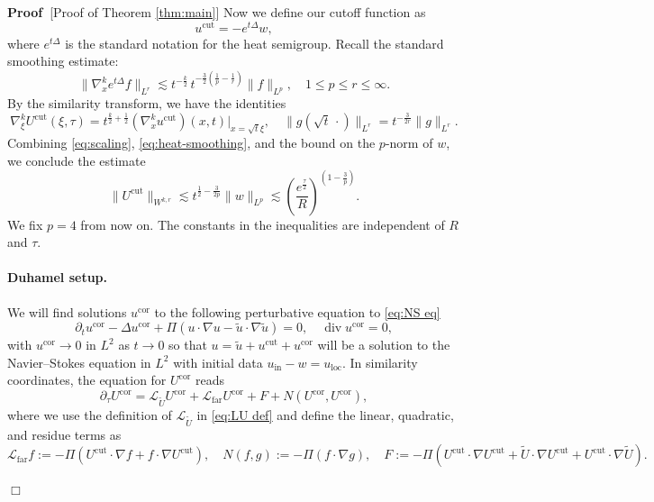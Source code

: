 \documentclass[11pt,a4paper]{article}
\numberwithin{equation}{section}
\newcommand{\assign}{:=}
\newcommand{\tmop}[1]{\ensuremath{\operatorname{#1}}}
\newenvironment{proof}{\noindent\textbf{Proof\ }}{\hspace*{\fill}$\Box$\medskip}
\begin{document}
\begin{proof}[Proof of Theorem \ref{thm:main}]
Now we define our cutoff function as\[u^{\text{cut}}=-e^{t
\Delta}w,\]
where $e^{t
\Delta}$ is the standard notation for the heat semigroup. Recall the standard smoothing estimate:
\begin{equation}\label{eq:heat-smoothing}
\|\nabla_x^k e^{t\Delta}f\|_{L^r}\lesssim t^{-\frac{k}{2}}\,t^{-\frac{3}{2}(\frac1p-\frac1r)}\|f\|_{L^p},
\quad 1\leqslant p\leqslant r\leqslant\infty.
\end{equation}
By the similarity transform, we have the identities
\begin{equation}\label{eq:scaling}
\nabla_\xi^k U^{\text{cut}}(\xi,\tau)
=t^{\frac{k}{2}+\frac12}(\nabla_x^k u^{\text{cut}})(x,t)\Big|_{x=\sqrt t\xi},
\quad 
\|g(\sqrt t\,\cdot)\|_{L^r}=t^{-\frac{3}{2r}}\|g\|_{L^r}.
\end{equation}
Combining \eqref{eq:scaling}, \eqref{eq:heat-smoothing}, and the bound on the $p$-norm of $w$, we conclude the estimate
\begin{equation}
    \|U^{\text{cut}}\|_{W^{k,r}}
\lesssim  t^{\frac12-\frac{3}{2p}}\|w\|_{L^p}
\lesssim (\frac{e^{\frac\tau2}}{R})^{(1-\frac{3}{p})}.
\label{ucut est}
\end{equation}
We fix $p=4$ from now on. 
The constants in the inequalities are independent of $R$ and $\tau$.
\paragraph{Duhamel setup.}
We will find solutions $u^{\text{cor}}$ to the following perturbative equation to \eqref{eq:NS eq} \[\partial_tu^{\text{cor}}-\Delta u^{\text{cor}}+\Pi(u\cdot\nabla u-\widetilde{u}\cdot\nabla\widetilde{u})=0,\quad \tmop{div}u^{\text{cor}}=0,\]
with $u^{\text{cor}}\to0$ in $L^2$ as $t\to 0$ so that $u=\widetilde{u}+u^{\text{cut}}+u^{\text{cor}}$ will be a solution to the Navier--Stokes equation in $L^2$ with initial data $u_{\tmop{in}}-w=u_{\tmop{loc}}$. In  similarity coordinates, the equation for $U^{\text{cor}}$ reads \begin{equation}
    \partial_\tau U^{\text{cor}}=\mathcal{L}_{\widetilde{U}}U^{\text{cor}}+\mathcal{L}_{\tmop{far}}U^{\text{cor}}+F+N(U^{\text{cor}},U^{\text{cor}}),\label{ucor eqn}
\end{equation}where we use the definition of $\mathcal{L}_{\widetilde{U}}$ in \eqref{eq:LU def} and define the linear, quadratic, and residue terms as \[\mathcal{L}_{\tmop{far}}f\assign-\Pi (U^{\text{cut}}\cdot\nabla f+f\cdot\nabla U^{\text{cut}}),\quad N(f,g)\assign-\Pi (f\cdot\nabla g),\quad F\assign-\Pi (U^{\text{cut}}\cdot\nabla U^{\text{cut}}+\widetilde{U}\cdot\nabla U^{\text{cut}}+U^{\text{cut}}\cdot\nabla \widetilde{U}).\]


\end{proof}
\end{document}
